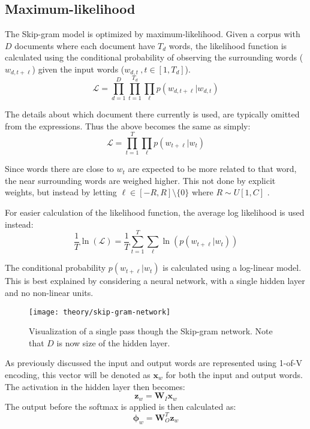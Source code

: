 \newpage
\subsection{Maximum-likelihood}

The Skip-gram model is optimized by maximum-likelihood. Given a corpus with $D$ documents where each document have $T_d$ words, the likelihood function is calculated using the conditional probability of observing the surrounding words ($w_{d, t + \ell}$) given the input words ($w_{d, t}\ , t \in [1, T_d]$).
\begin{equation}
\mathcal{L} = \prod_{d = 1}^D \prod_{t = 1}^{T_d} \prod_{\ell} p(w_{d, t + \ell} | w_{d, t})
\end{equation}

The details about which document there currently is used, are typically omitted from the expressions. Thus the above becomes the same as simply:
\begin{equation}
\mathcal{L} = \prod_{t = 1}^{T} \prod_{\ell} p(w_{t + \ell} | w_{t})
\end{equation}

Since words there are close to $w_t$ are expected to be  more related to that word, the near surrounding words are weighed higher. This not done by explicit weights, but instead by letting $\ell \in [-R, R] \setminus \{ 0 \}$ where $R \sim U[1, C]$ \cite{word2vec-comparing}.

For easier calculation of the likelihood function, the average log likelihood is used instead:
\begin{equation}
\frac{1}{T} \ln( \mathcal{L} ) = \frac{1}{T} \sum_{t = 1}^T \sum_{\ell} \ln( p(w_{t + \ell} | w_t) )
\end{equation}

The conditional probability $p(w_{t + \ell} | w_t)$ is calculated using a log-linear model. This is best explained by considering a neural network, with a single hidden layer and no non-linear units. 

\begin{figure}[h]
	\centering
	\texttt{[image: theory/skip-gram-network]}
	\caption{Visualization of a single pass though the Skip-gram network. Note that $D$ is now size of the hidden layer.}
\end{figure}

As previously discussed the input and output words are represented using 1-of-V encoding, this vector will be denoted as $\mathbf{x}_w$ for both the input and output words. The activation in the hidden layer then becomes:
\begin{equation}
\mathbf{z}_w = \mathbf{W}_I \mathbf{x}_w
\end{equation}
The output before the softmax is applied is then calculated as:
\begin{equation}
\boldsymbol\phi_w = \mathbf{W}_O^T \mathbf{z}_w
\end{equation}

